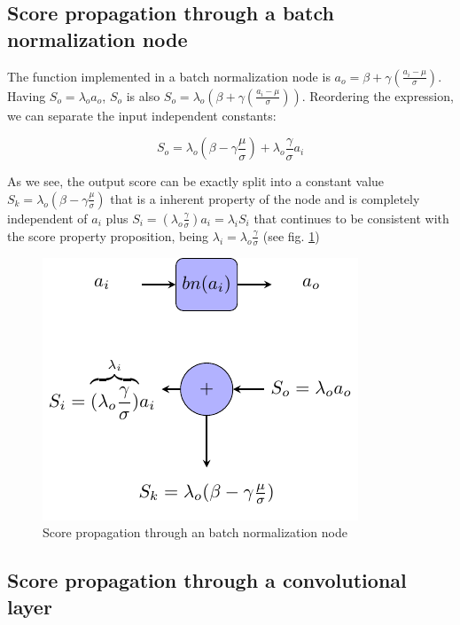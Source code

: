\documentclass[review]{elsarticle}
\theoremstyle{definition} %
\theoremstyle{remark}
\begin{document}
\subsection{Score propagation through a batch normalization node} 

The function implemented in a batch normalization node is $a_o = \beta + \gamma (\frac{a_i - \mu}{\sigma})$. Having $S_o = \lambda_o a_o$, $S_o$ is also $S_o = \lambda_o ( \beta + \gamma (\frac{a_i - \mu}{\sigma}))$. Reordering the expression, we can separate the input independent constants: 

\begin{equation}
	S_o = \lambda_o (\beta - \gamma \frac{\mu}{\sigma}) + \lambda_o \frac{\gamma}{\sigma}a_i
\end{equation}

As we see, the output score can be exactly split into a constant value $S_k = \lambda_o (\beta - \gamma \frac{\mu}{\sigma})$ that is a inherent property of the node and is completely independent of $a_i$ plus $S_i = (\lambda_o \frac{\gamma}{\sigma})a_i = \lambda_i S_i$ that continues to be consistent with the score property proposition, being $\lambda_i = \lambda_o \frac{\gamma}{\sigma}$ (see fig. \ref{fig:score_bn})

\begin{figure}[!ht]
	\centering
	\includegraphics{./figures/score_bn.pdf}
	\caption{Score propagation through an batch normalization node}
	\label{fig:score_bn}
\end{figure}

\subsection{Score propagation through a convolutional layer}
\end{document}
